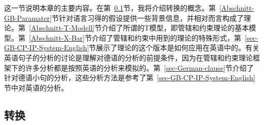 这一节说明本章的主要内容。在第~\ref{Abschnitt-Transformationen}节，我将介绍转换的概念。第~\ref{Abschnitt-GB-Paramater}节针对语言习得的假设提供一些背景信息，并相对而言构成了理论。第~\ref{Abschnitt-T-Modell}节介绍了所谓的T模型，即管辖和约束理论的基本模型。第~\ref{Abschnitt-X-Bar}节介绍了管辖和约束中用到的\xbar 理论的特殊形式，第~\ref{sec-GB-CP-IP-System-English}节展示了\xbar 理论的这个版本是如何应用在英语中的。有关英语句子的分析的讨论是理解对德语的分析的前提条件，因为在管辖和约束理论框架下的许多分析都是按照英语的分析来模拟的。第~\ref{sec-German-clause}节介绍了针对德语小句的分析，这些分析方法是参考了第~\ref{sec-GB-CP-IP-System-English}节中对英语的分析。

\subsection{转换}
\label{Abschnitt-Transformationen}

